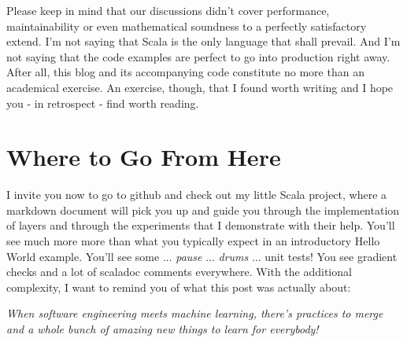 \documentclass[]{report}
\begin{document}
Please keep in mind that our discussions didn't cover performance, maintainability or even mathematical soundness to a perfectly satisfactory extend. I'm not saying that Scala is the only language that shall prevail. And I'm not saying that the code examples are perfect to go into production right away. After all, this blog and its accompanying code constitute no more than an academical exercise. An exercise, though, that I found worth writing and I hope you - in retrospect - find worth reading.


\section{Where to Go From Here}

I invite you now to go to github and check out my little Scala project, where a markdown document will pick you up and guide you through the implementation of layers and through the experiments that I demonstrate with their help. You'll see much more more than what you typically expect in an introductory Hello World example. You'll see some ... \emph{pause} ... \emph{drums} ... unit tests! You see gradient checks and a lot of scaladoc comments everywhere. With the additional complexity, I want to remind you of what this post was actually about:


\bigskip

\emph{When software engineering meets machine learning, there's practices to merge and a whole bunch of amazing new things to learn for everybody! }
\end{document}
